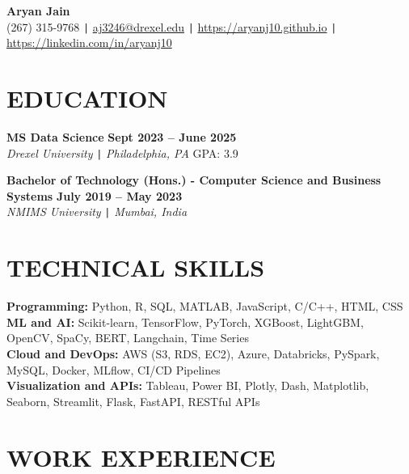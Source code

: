 \documentclass[10pt]{article}
\begin{document}
\begin{center}
    \textbf{\fontsize{18}{18}\selectfont Aryan Jain} \\
    (267) 315-9768 \texttt{|} \href{mailto:aj3246@drexel.edu}{aj3246@drexel.edu} \texttt{|}
    \href{https://aryanj10.github.io}{https://aryanj10.github.io} \texttt{|}  
    \href{https://linkedin.com/in/aryanj10}{https://linkedin.com/in/aryanj10}
\end{center}

\vspace{-0.7cm}
\section*{EDUCATION} 
\vspace{-0.2cm} 

\noindent 
\textbf{MS Data Science} \hfill \textbf{Sept 2023 -- June 2025} \\
\textit{Drexel University} \texttt{|} \textit{Philadelphia, PA} \hfill GPA: 3.9

\noindent 
\textbf{Bachelor of Technology (Hons.) - Computer Science and Business Systems} \hfill \textbf{July 2019 --  May 2023} \\
\textit{NMIMS University} \texttt{|} \textit{Mumbai, India} 


\vspace{-0.4cm} 
\section*{TECHNICAL SKILLS} 
\vspace{-0.2cm}
\noindent
\textbf{Programming:} Python, R, SQL, MATLAB, JavaScript, C/C++, HTML, CSS \\
\textbf{ML and AI:} Scikit-learn, TensorFlow, PyTorch, XGBoost, LightGBM, OpenCV, SpaCy, BERT, Langchain, Time Series \\
\textbf{Cloud and DevOps:} AWS (S3, RDS, EC2), Azure, Databricks, PySpark, MySQL, Docker, MLflow, CI/CD Pipelines \\
\textbf{Visualization and APIs:} Tableau, Power BI, Plotly, Dash, Matplotlib, Seaborn, Streamlit, Flask, FastAPI, RESTful APIs

\vspace{-0.5cm}
\section*{WORK EXPERIENCE}
\end{document}
